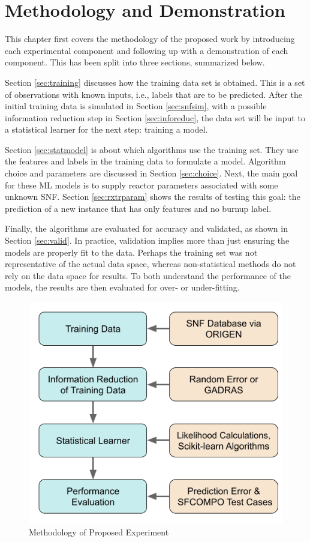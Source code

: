 \chapter{Methodology and Demonstration}
\label{ch:method}

This chapter first covers the methodology of the proposed work by introducing
each experimental component and following up with a demonstration of each
component. This has been split into three sections, summarized below.

Section \ref{sec:training} discusses how the training data set is obtained.
This is a set of observations with known inputs, i.e., labels that are to be
predicted. After the initial training data is simulated in Section
\ref{sec:snfsim}, with a possible information reduction step in Section
\ref{sec:inforeduc}, the data set will be input to a statistical learner for
the next step: training a model.

Section \ref{sec:statmodel} is about which algorithms use the training set.
They use the features and labels in the training data to formulate a model.
Algorithm choice and parameters are discussed in Section \ref{sec:choice}.
Next, the main goal for these \gls{ML} models is to supply reactor
parameters associated with some unknown \gls{SNF}. Section \ref{sec:rxtrparam}
shows the results of testing this goal: the prediction of a new instance that
has only features and no burnup label.  

Finally, the algorithms are evaluated for accuracy and validated, as shown in
Section \ref{sec:valid}. In practice, validation implies more than just
ensuring the models are properly fit to the data.  Perhaps the training set was
not representative of the actual data space, whereas non-statistical methods do
not rely on the data space for results. To both understand the performance of
the models, the results are then evaluated for over- or under-fitting. 

\begin{figure}[!htb]
  \centering
  \includegraphics[width=0.8\linewidth]{./chapters/method/methodology.png}
  \caption{Methodology of Proposed Experiment}
  \label{fig:method}
\end{figure}

